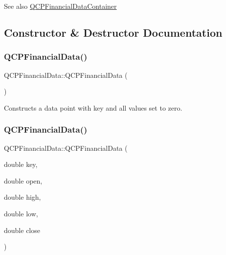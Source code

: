 \begin{DoxySeeAlso}{See also}
\mbox{\hyperlink{qcustomplot_8h_ae36e482e04f19a54782f01ab38c354a6}{Q\+C\+P\+Financial\+Data\+Container}} 
\end{DoxySeeAlso}


\subsection{Constructor \& Destructor Documentation}
\mbox{\label{class_q_c_p_financial_data_a1ca53b3a9ae4e9658a4fd1ca57d76ba4}} 
\subsubsection{\texorpdfstring{QCPFinancialData()}{QCPFinancialData()}\hspace{0.1cm}{\footnotesize\ttfamily [1/2]}}
{\footnotesize\ttfamily Q\+C\+P\+Financial\+Data\+::\+Q\+C\+P\+Financial\+Data (\begin{DoxyParamCaption}{ }\end{DoxyParamCaption})}

Constructs a data point with key and all values set to zero. \mbox{\label{class_q_c_p_financial_data_a069b72c514dfd4fc8e1d5df811e54ca4}} 
\subsubsection{\texorpdfstring{QCPFinancialData()}{QCPFinancialData()}\hspace{0.1cm}{\footnotesize\ttfamily [2/2]}}
{\footnotesize\ttfamily Q\+C\+P\+Financial\+Data\+::\+Q\+C\+P\+Financial\+Data (\begin{DoxyParamCaption}\item[{double}]{key,  }\item[{double}]{open,  }\item[{double}]{high,  }\item[{double}]{low,  }\item[{double}]{close }\end{DoxyParamCaption})}

